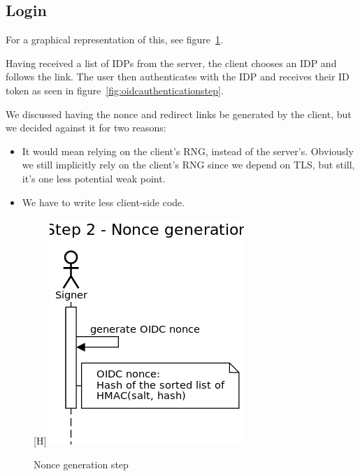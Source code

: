 \subsection{Login}\label{subsec:login}
For a graphical representation of this, see figure~\ref{fig:noncegenerationstep}.

Having received a list of \gls{IDP}s from the server, the client chooses an \gls{IDP} and follows the link.
The user then authenticates with the \gls{IDP} and receives their ID token as seen in figure~\ref{fig:oidcauthenticationstep}.

We discussed having the nonce and redirect links be generated by the client,
but we decided against it for two reasons:
\begin{itemize}
    \item It would mean relying on the client's \gls{RNG}, instead of the server's.
    Obviously we still implicitly rely on the client's \gls{RNG} since we depend on \gls{TLS},
    but still, it's one less potential weak point.
    \item We have to write less client-side code.
\end{itemize}

\begin{figure}
    \begin{center}[H]
        \includegraphics[scale=0.5]{images/protocol_step2_nonce_generation.png}
        \caption{Nonce generation step}
        \label{fig:noncegenerationstep}
    \end{center}
\end{figure}

